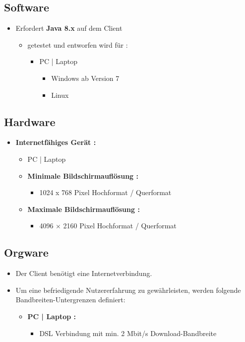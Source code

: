 	\subsection{Software}
	\begin{itemize}
		\item Erfordert \textbf{Java 8.x} auf dem Client
		\begin{itemize}
			\item getestet und entworfen wird für :
			\begin{itemize}
				\item PC | Laptop
				\begin{itemize}
					\item Windows ab Version 7
					\item Linux
				\end{itemize}
			\end{itemize}
		\end{itemize}
	\end{itemize}
	\subsection{Hardware}
	\begin{itemize}
		\item \textbf{Internetfähiges Gerät :}
		\begin{itemize}
			\item PC | Laptop
			\item \textbf{Minimale Bildschirmauflösung :}
				\begin{itemize}
					\item 1024 x 768 Pixel Hochformat / Querformat
				\end{itemize}
					\item \textbf{Maximale Bildschirmauflösung :}
				\begin{itemize}
				\item 4096 × 2160 Pixel Hochformat / Querformat
				\end{itemize}		
		\end{itemize}
	\end{itemize}
	\subsection{Orgware}
	\begin{itemize}
		\item Der Client benötigt eine Internetverbindung.
		\item Um eine befriedigende Nutzererfahrung zu gewährleisten, werden folgende Bandbreiten-Untergrenzen definiert:
		\begin{itemize}
			\item \textbf{ PC | Laptop :}
			\begin{itemize}
				\item DSL Verbindung mit min. 2 Mbit/s Download-Bandbreite
			\end{itemize}
		\end{itemize}
	\end{itemize}
